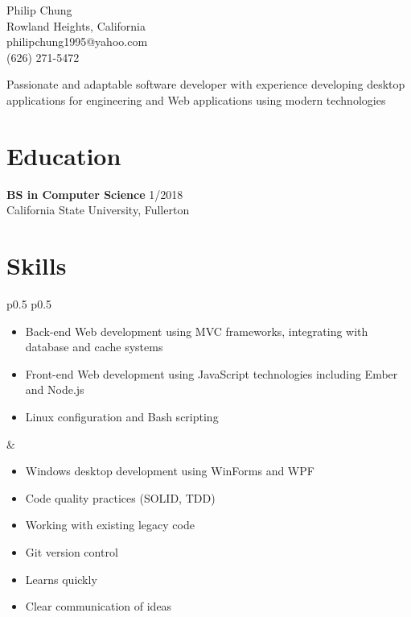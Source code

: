 \documentclass[10pt]{article}
\newcommand{\baseheader}[3]{#1 \hfill #2 \\ #3}
\begin{document}
	\begin{center}
		{\LARGE Philip Chung} \\
		Rowland Heights, California \\
		philipchung1995@yahoo.com \\
		(626) 271-5472 \\
	\end{center}

	Passionate and adaptable software developer with experience developing desktop applications for engineering and Web applications using modern technologies

	\section*{Education}

	\baseheader{\textbf{BS in Computer Science}}{1/2018}{California State University, Fullerton}

	\section*{Skills}

	\begin{tabular}{p{0.5\textwidth} p{0.5\textwidth}}
		\begin{minipage}[t]{\linewidth}
			\raggedright
			\begin{itemize}[nosep]
				\item Back-end Web development using MVC frameworks, integrating with database and cache systems
				\item Front-end Web development using JavaScript technologies including Ember and Node.js
				\item Linux configuration and Bash scripting
			\end{itemize}
		\end{minipage}
		&
		\begin{minipage}[t]{\linewidth}
			\raggedright
			\begin{itemize}[nosep]
				\item Windows desktop development using WinForms and WPF
				\item Code quality practices (SOLID, TDD)
				\item Working with existing legacy code
				\item Git version control
				\item Learns quickly
				\item Clear communication of ideas
			\end{itemize}
		\end{minipage}
	\end{tabular}
\end{document}
